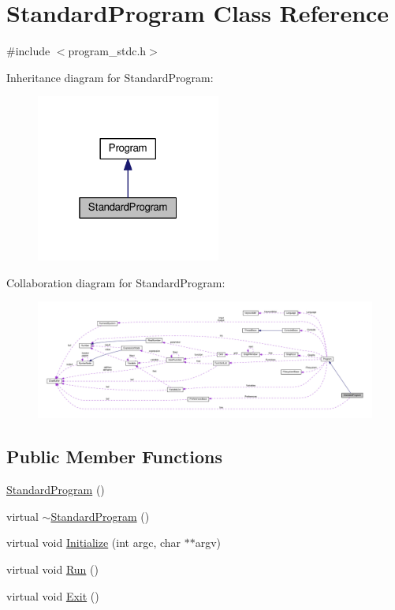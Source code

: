 \hypertarget{classStandardProgram}{}\section{Standard\+Program Class Reference}
\label{classStandardProgram}


{\ttfamily \#include $<$program\+\_\+stdc.\+h$>$}



Inheritance diagram for Standard\+Program\+:
\nopagebreak
\begin{figure}[H]
\begin{center}
\leavevmode
\includegraphics[width=172pt]{d7/dae/classStandardProgram__inherit__graph}
\end{center}
\end{figure}


Collaboration diagram for Standard\+Program\+:
\nopagebreak
\begin{figure}[H]
\begin{center}
\leavevmode
\includegraphics[width=350pt]{da/df3/classStandardProgram__coll__graph}
\end{center}
\end{figure}
\subsection*{Public Member Functions}
\begin{DoxyCompactItemize}
\item 
\hyperlink{classStandardProgram_a8f86a2eaf4593fd52dc4d13c40815f05}{Standard\+Program} ()
\item 
virtual \hyperlink{classStandardProgram_a0951dd7180268e21085aa33914968984}{$\sim$\+Standard\+Program} ()
\item 
virtual void \hyperlink{classStandardProgram_a9e887904df28471bc3801384e5a1f151}{Initialize} (int argc, char $\ast$$\ast$argv)
\item 
virtual void \hyperlink{classStandardProgram_a71dce9fdccf23ac49ba2362dcae744d3}{Run} ()
\item 
virtual void \hyperlink{classStandardProgram_a1354fa2291bf56d90b7d46d841a02b8c}{Exit} ()
\end{DoxyCompactItemize}

